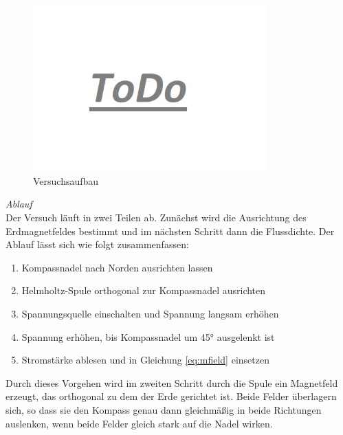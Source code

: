 \begin{figure}[h!]
	\centering
	\includegraphics[width=0.8\textwidth]{images/todo.jpg}
	\caption{Versuchsaufbau}
	\label{img:experiment-devices}
\end{figure}

\textit{Ablauf}\\
Der Versuch läuft in zwei Teilen ab. Zunächst wird die Ausrichtung des Erdmagnetfeldes bestimmt und im nächsten Schritt dann die Flussdichte. Der Ablauf lässt sich wie folgt zusammenfassen:
\begin{enumerate}
	\setlength{\itemsep}{-2pt}
	\item Kompassnadel nach Norden ausrichten lassen
	\item Helmholtz-Spule orthogonal zur Kompassnadel ausrichten
	\item Spannungsquelle einschalten und Spannung langsam erhöhen
	\item Spannung erhöhen, bis Kompassnadel um 45° ausgelenkt ist
	\item Stromstärke ablesen und in Gleichung \eqref{eq:mfield} einsetzen
\end{enumerate}

Durch dieses Vorgehen wird im zweiten Schritt durch die Spule ein Magnetfeld erzeugt, das orthogonal zu dem der Erde gerichtet ist. Beide Felder überlagern sich, so dass sie den Kompass genau dann gleichmäßig in beide Richtungen auslenken, wenn beide Felder gleich stark auf die Nadel wirken.